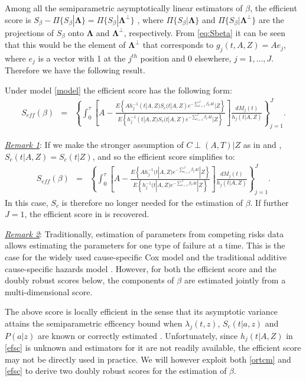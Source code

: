 \documentclass[11pt]{article}
\newcommand{\ee}{\end{eqnarray}}
\newcommand{\eqnn}{\begin{eqnarray*}}
\newcommand{\een}{\end{eqnarray*}}
\newcommand{\be}{\begin{eqnarray}}
\begin{document}
Among all the semiparametric asymptotically linear estimators of $\beta$,
the efficient score is $S_\beta- \Pi\{S_\beta | \mathbf\Lambda\} = \Pi\{S_\beta | \mathbf\Lambda^\perp\}$ \citep{tsiatis2007semiparametric}, where $\Pi\{S_\beta | \mathbf\Lambda \}$ and  $\Pi\{S_\beta | \mathbf\Lambda^\perp\}$ are the projections of  $S_\beta$ onto $\mathbf\Lambda$ and $\mathbf\Lambda^\perp$, respectively.
 From \eqref{eq:Sbeta} it can be seen that this would be the element of $\mathbf\Lambda^\perp$ that corresponds to $g_j(t,A,Z)=Ae_j$, %
where $e_j$ is a vector with 1 at the $j^{th}$ position and 0 elsewhere, $j=1, ..., J$. 
Therefore we have the following result.
\begin{theorem}\label{efflemma}
Under model \eqref{model} the efficient score has the following form:
\be\label{efsc}
S_{eff} (\beta) &=&\left\{\int_0^\tau \left[A -\frac{{E}\left\{A
h_j^{-1}(t | A,Z)S_{c}(t | A,Z) e^{-\sum_{l=1}^J\beta_{l}At} | Z\right\}}
{{E}\left\{ h_j^{-1}(t | A, Z)S_{c}(t | A,Z) e^{-\sum_{l=1}^J\beta_{l}At} | Z\right\}}\right]\frac{dM_j(t)}
{h_j(t | A,Z)}\right\}_{j=1}^J.
\ee
\end{theorem}
\underline{\it Remark 1}: If we make the stronger assumption of $C \perp (A,T) | Z$ as in \cite{Dukes:19} and \cite{hou2019estimating}, $S_{c}(t | A,Z)=S_{c}(t | Z)$, and so the efficient score simplifies to:
\eqnn
S_{eff} (\beta) &=&\left\{\int_0^\tau \left[A -\frac{E\left\{Ah_j^{-1}(t | A,Z)e^{-\sum_{l=1}^J\beta_{l}At} | Z\right\}}{E\left\{h_j^{-1}(t | A, Z)e^{-\sum_{l=1}^J\beta_{l}At} | Z\right\}}\right]\frac{dM_j(t)}{h_j(t | A,Z)}\right\}_{j=1}^J.
\een
In this case, $S_c$ is therefore no longer needed for the estimation of $\beta$. 
If further $J=1$, the efficient score in \cite{Dukes:19} is recovered. 

\noindent\underline{\it Remark 2}: Traditionally, estimation of parameters from competing risks data allows estimating the parameters for one type of failure at a time.
 This is the case  for the widely used cause-specific Cox model and the traditional additive cause-specific hazards model \cite[]{shen1999confidence}. 
 However, for both the efficient score and the doubly robust scores below, 
the components of $\beta$ are estimated jointly from a multi-dimensional score.

The above score is locally efficient in the sense that its asymptotic variance attains the semiparametric efficency bound when $\lambda_j(t,z)$, $S_c(t | a, z)$ and $P(a | z)$ are known or correctly estimated  \citep[Theorem 4.1]{tsiatis2007semiparametric}.
Unfortunately, since $h_j(t | A, Z)$ in \eqref{efsc} is unknown and estimators for it are not readily available, the efficient score may not be directly used in practice. 
We will however exploit both \eqref{ortcm} and \eqref{efsc} to derive two doubly robust scores for the estimation of $\beta$.
\end{document}
